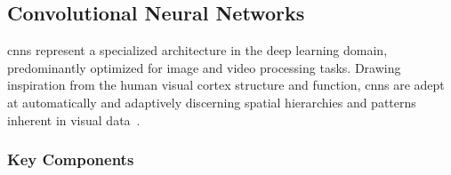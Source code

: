 \subsection{Convolutional Neural Networks}

\glspl{cnn} represent a specialized architecture in the deep learning domain, predominantly optimized for image and video processing tasks. Drawing inspiration from the human visual cortex structure and function, \glspl{cnn} are adept at automatically and adaptively discerning spatial hierarchies and patterns inherent in visual data~\cite{lecun1998gradient}.

\subsubsection{Key Components}

